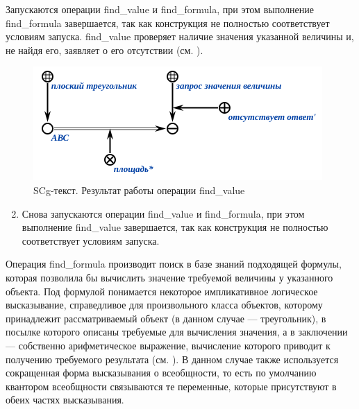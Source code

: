 Запускаются операции find\_value и find\_formula, при этом выполнение find\_formula завершается, так как конструкция не полностью соответствует условиям запуска. find\_value проверяет наличие значения указанной величины и, не найдя его, заявляет о его отсутствии (см. ).

\begin{figure}[H]
	\includegraphics[scale=0.85]{images/part7/chapter_learning_systems/step2-kbe.png}
	\caption{SCg-текст. Результат работы операции find\_value}
	\label{fig:step2}
\end{figure}

\begin{enumerate}
	\setcounter{enumi}{1}
	\item
	Снова запускаются операции find\_value и find\_formula, при этом выполнение find\_value завершается, так как конструкция не полностью соответствует условиям запуска.
\end{enumerate}

Операция find\_formula производит поиск в базе знаний подходящей формулы, которая позволила бы вычислить значение требуемой величины у указанного объекта. Под формулой понимается некоторое импликативное логическое высказывание, справедливое для произвольного класса объектов, которому принадлежит рассматриваемый объект (в данном случае --- треугольник), в посылке которого описаны требуемые для вычисления значения, а в заключении --- собственно арифметическое выражение, вычисление которого приводит к получению требуемого результата (см. ). В данном случае также используется сокращенная форма высказывания о всеобщности, то есть по умолчанию квантором всеобщности связываются те переменные, которые присутствуют в обеих частях высказывания.

